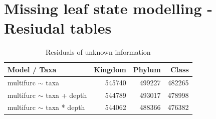   \section{Missing leaf state modelling - Resiudal tables}\label{sec:Residuals unknown information}

    \begin{table}[h!]
      \begin{center}
        \begin{tabular}{ |l|r|r|r| }
          \hline
          Model / Taxa & Kingdom & Phylum & Class \\
          \hline \hline
          multifurc $\sim$ taxa & 545740 & \cellcolor{green!10}499227 & \cellcolor{green!30}482265 \\
          \hline
          multifurc $\sim$ taxa + depth & 544789 & \cellcolor{green!10}493017 & \cellcolor{green!50}478998 \\
          \hline
          multifurc $\sim$ taxa * depth & 544062 & \cellcolor{green!30}488366 & \cellcolor{green!50}476382 \\
          \hline
        \end{tabular}
      \end{center}
      \caption{Residuals of unknown information}
    \end{table}


